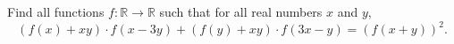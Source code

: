 Find all functions $f:\mathbb{R}\rightarrow \mathbb{R}$ such that for all real numbers $x$ and $y$,
$$(f(x)+xy)\cdot f(x-3y)+(f(y)+xy)\cdot f(3x-y)=(f(x+y))^2.$$